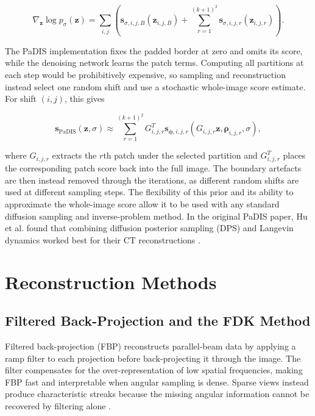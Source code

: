 \begin{equation}
\nabla_{\mathbf{z}}\log p_\sigma(\mathbf{z})
=
\sum_{i,j}
\left(
\mathbf{s}_{\sigma,i,j,B}(\mathbf{z}_{i,j,B})
+
\sum_{r=1}^{(k+1)^2}
\mathbf{s}_{\sigma,i,j,r}(\mathbf{z}_{i,j,r})
\right).
\label{eq:padis_whole_image_score_sum}
\end{equation}

The PaDIS implementation fixes the padded border at zero and omits its score, while the denoising network learns the patch terms. Computing all partitions at each step would be prohibitively expensive, so sampling and reconstruction instead select one random shift and use a stochastic whole-image score estimate. For shift $(i,j)$, this gives

\begin{equation}
\mathbf{s}_{\mathrm{PaDIS}}(\mathbf{z},\sigma)
\approx
\sum_{r=1}^{(k+1)^2}
G_{i,j,r}^T
\mathbf{s}_{\boldsymbol{\phi},i,j,r}
(G_{i,j,r}\mathbf{z},\boldsymbol{\rho}_{i,j,r},\sigma),
\label{eq:padis_score_estimate}
\end{equation}

where $G_{i,j,r}$ extracts the $r$th patch under the selected partition and $G_{i,j,r}^T$ places the corresponding patch score back into the full image. The boundary artefacts are then instead removed through the iterations, as different random shifts are used at different sampling steps. The flexibility of this prior and its ability to approximate the whole-image score allow it to be used with any standard diffusion sampling and inverse-problem method. In the original PaDIS paper, Hu et al. found that combining diffusion posterior sampling (DPS) and Langevin dynamics worked best for their CT reconstructions \cite{}.

\section{Reconstruction Methods}
\label{sec:reconstruction_methods}

\subsection{Filtered Back-Projection and the FDK Method}
\label{subsec:fbp_fdk}

Filtered back-projection (FBP) reconstructs parallel-beam data by applying a ramp filter to each projection before back-projecting it through the image. The filter compensates for the over-representation of low spatial frequencies, making FBP fast and interpretable when angular sampling is dense. Sparse views instead produce characteristic streaks because the missing angular information cannot be recovered by filtering alone \cite{}.

